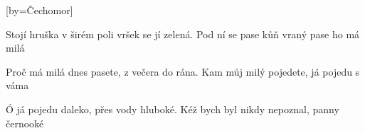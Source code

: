 [by={Čechomor}]

\beginverse{}
Stojí hruška v širém poli
vršek se jí zelená.
\lrep{} Pod ní se pase kůň vraný
pase ho má milá \rrep{}
\endverse{}

\beginverse{}
Proč má milá dnes pasete,
z večera do rána.
\lrep{} Kam můj milý pojedete,
já pojedu s váma \rrep{}
\endverse{}

\beginverse{}
Ó já pojedu daleko,
přes vody hluboké.
\lrep{} Kéž bych byl nikdy nepoznal,
panny černooké \rrep{}
\endverse{}

\endsong{}

